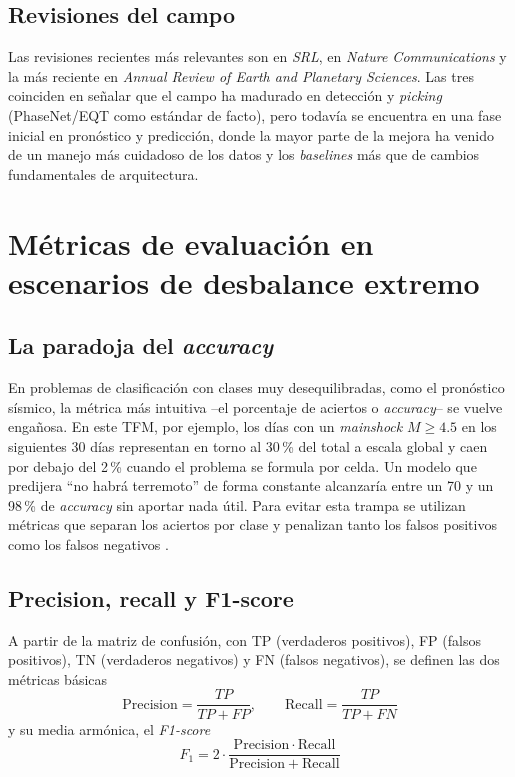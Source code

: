 \subsection{Revisiones del campo}

Las revisiones recientes más relevantes son \citet{kong2019mlseismology} en \emph{SRL}, \citet{beroza2021dlreview} en \emph{Nature Communications} y la más reciente \citet{mousavi2023review} en \emph{Annual Review of Earth and Planetary Sciences}. Las tres coinciden en señalar que el campo ha madurado en detección y \textit{picking} (PhaseNet/EQT como estándar de facto), pero todavía se encuentra en una fase inicial en pronóstico y predicción, donde la mayor parte de la mejora ha venido de un manejo más cuidadoso de los datos y los \textit{baselines} más que de cambios fundamentales de arquitectura.

\section{Métricas de evaluación en escenarios de desbalance extremo}
\label{metricas-desbalance}

\subsection{La paradoja del \textit{accuracy}}
\label{paradoja-accuracy}

En problemas de clasificación con clases muy desequilibradas, como el pronóstico sísmico, la métrica más intuitiva --el porcentaje de aciertos o \textit{accuracy}-- se vuelve engañosa. En este TFM, por ejemplo, los días con un \textit{mainshock} $M\geq 4.5$ en los siguientes 30 días representan en torno al 30\,\% del total a escala global y caen por debajo del 2\,\% cuando el problema se formula por celda. Un modelo que predijera ``no habrá terremoto'' de forma constante alcanzaría entre un 70 y un 98\,\% de \textit{accuracy} sin aportar nada útil. Para evitar esta trampa se utilizan métricas que separan los aciertos por clase y penalizan tanto los falsos positivos como los falsos negativos \citep{he2009imbalanced}.

\subsection{Precision, recall y F1-score}
\label{precision-recall-f1}

A partir de la matriz de confusión, con TP (verdaderos positivos), FP (falsos positivos), TN (verdaderos negativos) y FN (falsos negativos), se definen las dos métricas básicas
\begin{equation}
  \mathrm{Precision} = \frac{TP}{TP + FP}, \qquad \mathrm{Recall} = \frac{TP}{TP + FN}
  \label{eq:precision-recall}
\end{equation}
y su media armónica, el \textit{F1-score}
\begin{equation}
  F_1 = 2 \cdot \frac{\mathrm{Precision} \cdot \mathrm{Recall}}{\mathrm{Precision} + \mathrm{Recall}}
  \label{eq:f1}
\end{equation}

